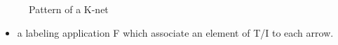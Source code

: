 \documentclass{beamer}
\begin{document}
\begin{frame}[fragile]
\begin{columns}
\begin{column}{0.65\textwidth}
\begin{figure}
				\caption{Pattern of a K-net}
				\label{fig:KAminor}
			\end{figure}
			\begin{itemize}
				\item a labeling application F which associate an element of T/I to each arrow.
			\end{itemize}

		\end{column}
	\end{columns}

\end{frame}
\end{document}
